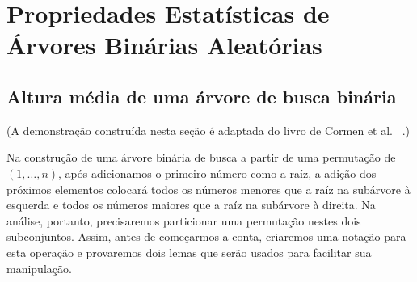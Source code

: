 \section{Propriedades Estatísticas de Árvores Binárias Aleatórias}

\subsection{Altura média de uma árvore de busca binária}

(A demonstração construída nesta seção é adaptada do livro de Cormen et al.%
~\cite[p.~300]{CormenLeisersonRivestStein2009}.)

Na construção de uma árvore binária de busca
a partir de uma permutação de $(1, \dots, n)$,
após adicionamos o primeiro número como a raíz,
a adição dos próximos elementos colocará
todos os números menores que a raíz na subárvore à esquerda
e todos os números maiores que a raíz na subárvore à direita.
Na análise, portanto,
precisaremos particionar uma permutação nestes dois subconjuntos.
Assim,
antes de começarmos a conta,
criaremos uma notação para esta operação
e provaremos dois lemas que serão usados para facilitar sua manipulação.
